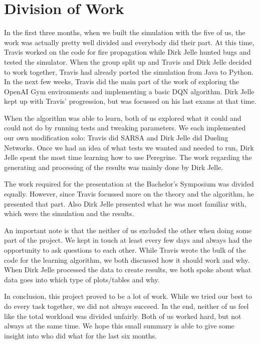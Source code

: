 
\clearpage
\section*{Division of Work}\label{sec:division}

In the first three months, when we built the simulation with the five of us, the work was actually pretty well divided and everybody did their part. At this time, Travis worked on the code for fire propagation while Dirk Jelle hunted bugs and tested the simulator. When the group split up and Travis and Dirk Jelle decided to work together, Travis had already ported the simulation from Java to Python. In the next few weeks, Travis did the main part of the work of exploring the OpenAI Gym environments and implementing a basic DQN algorithm. Dirk Jelle kept up with Travis' progression, but was focussed on his last exams at that time.

When the algorithm was able to learn, both of us explored what it could and could not do by running tests and tweaking parameters. We each implemented our own modification solo: Travis did SARSA and Dirk Jelle did Dueling Networks. Once we had an idea of what tests we wanted and needed to run, Dirk Jelle spent the most time learning how to use Peregrine. The work regarding the generating and processing of the results was mainly done by Dirk Jelle.

The work required for the presentation at the Bachelor's Symposium was divided equally. However, since Travis focussed more on the theory and the algorithm, he presented that part. Also Dirk Jelle presented what he was most familiar with, which were the simulation and the results.

An important note is that the neither of us excluded the other when doing some part of the project. We kept in touch at least every few days and always had the opportunity to ask questions to each other. While Travis wrote the bulk of the code for the learning algorithm, we both discussed how it should work and why. When Dirk Jelle processed the data to create results, we both spoke about what data goes into which type of plots/tables and why.

In conclusion, this project proved to be a lot of work. While we tried our best to do every task together, we did not always succeed. In the end, neither of us feel like the total workload was divided unfairly. Both of us worked hard, but not always at the same time. We hope this small summary is able to give some insight into who did what for the last six months.
